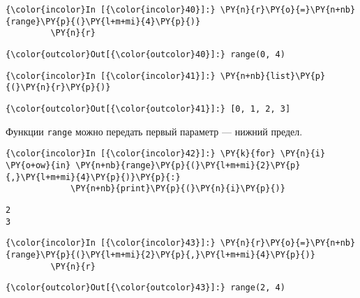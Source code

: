     \begin{Verbatim}[commandchars=\\\{\}]
{\color{incolor}In [{\color{incolor}40}]:} \PY{n}{r}\PY{o}{=}\PY{n+nb}{range}\PY{p}{(}\PY{l+m+mi}{4}\PY{p}{)}
         \PY{n}{r}
\end{Verbatim}

            \begin{Verbatim}[commandchars=\\\{\}]
{\color{outcolor}Out[{\color{outcolor}40}]:} range(0, 4)
\end{Verbatim}
        
    \begin{Verbatim}[commandchars=\\\{\}]
{\color{incolor}In [{\color{incolor}41}]:} \PY{n+nb}{list}\PY{p}{(}\PY{n}{r}\PY{p}{)}
\end{Verbatim}

            \begin{Verbatim}[commandchars=\\\{\}]
{\color{outcolor}Out[{\color{outcolor}41}]:} [0, 1, 2, 3]
\end{Verbatim}
        
    Функции \texttt{range} можно передать первый параметр --- нижний предел.

    \begin{Verbatim}[commandchars=\\\{\}]
{\color{incolor}In [{\color{incolor}42}]:} \PY{k}{for} \PY{n}{i} \PY{o+ow}{in} \PY{n+nb}{range}\PY{p}{(}\PY{l+m+mi}{2}\PY{p}{,}\PY{l+m+mi}{4}\PY{p}{)}\PY{p}{:}
             \PY{n+nb}{print}\PY{p}{(}\PY{n}{i}\PY{p}{)}
\end{Verbatim}

    \begin{Verbatim}[commandchars=\\\{\}]
2
3

    \end{Verbatim}

    \begin{Verbatim}[commandchars=\\\{\}]
{\color{incolor}In [{\color{incolor}43}]:} \PY{n}{r}\PY{o}{=}\PY{n+nb}{range}\PY{p}{(}\PY{l+m+mi}{2}\PY{p}{,}\PY{l+m+mi}{4}\PY{p}{)}
         \PY{n}{r}
\end{Verbatim}

            \begin{Verbatim}[commandchars=\\\{\}]
{\color{outcolor}Out[{\color{outcolor}43}]:} range(2, 4)
\end{Verbatim}
        
